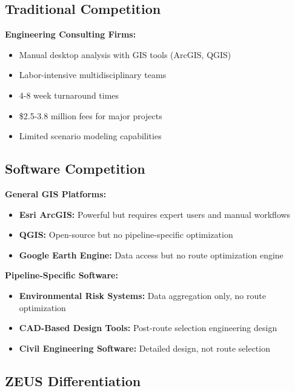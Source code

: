 \documentclass[11pt,letterpaper]{article}
\begin{document}
\subsection{Traditional Competition}

\textbf{Engineering Consulting Firms:}
\begin{itemize}[leftmargin=*]
    \item Manual desktop analysis with GIS tools (ArcGIS, QGIS)
    \item Labor-intensive multidisciplinary teams
    \item 4-8 week turnaround times
    \item \$2.5-3.8 million fees for major projects
    \item Limited scenario modeling capabilities
\end{itemize}

\subsection{Software Competition}

\textbf{General GIS Platforms:}
\begin{itemize}[leftmargin=*]
    \item \textbf{Esri ArcGIS:} Powerful but requires expert users and manual workflows
    \item \textbf{QGIS:} Open-source but no pipeline-specific optimization
    \item \textbf{Google Earth Engine:} Data access but no route optimization engine
\end{itemize}

\textbf{Pipeline-Specific Software:}
\begin{itemize}[leftmargin=*]
    \item \textbf{Environmental Risk Systems:} Data aggregation only, no route optimization
    \item \textbf{CAD-Based Design Tools:} Post-route selection engineering design
    \item \textbf{Civil Engineering Software:} Detailed design, not route selection
\end{itemize}

\subsection{ZEUS Differentiation}
\end{document}
